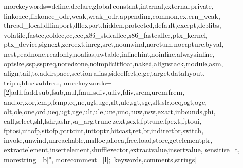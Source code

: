 \usepackage[english]{babel}
\usepackage[utf8]{inputenc}
\usepackage[T1]{fontenc}
\usepackage{helvet}
\usepackage{nimbusmononarrow}
\usepackage{euler}
\usepackage{tikz}
\usepackage{listings}
\usepackage{relsize}
\usepackage{booktabs}

\usetikzlibrary{arrows}
\usetikzlibrary{backgrounds}
\usetikzlibrary{chains}
\usetikzlibrary{fit}
\usetikzlibrary{positioning}
\usetikzlibrary{scopes}
\usetikzlibrary{trees}
\usetikzlibrary{automata}
\usetikzlibrary{positioning}
\usetikzlibrary{shapes.multipart}

{
	\begin{centering}
		\vspace{1.5em}
		\LARGE
    \insertframetitle
    \par
    \vspace{0.5em}
  \end{centering}
}

\lstset{basicstyle=\ttfamily\scriptsize}
\newcommand{\cinput}[1]{}
\newcommand{\cinline}[1]{\lstinline[language=C,basicstyle=\ttfamily]!#1!}
\newcommand{\cppinput}[1]{}
\newcommand{\cppinline}[1]{\lstinline[language=C++,basicstyle=\ttfamily]!#1!}
\newcommand{\llvminput}[1]{}
\newcommand{\llvminline}[1]{\lstinline[language=LLVM,basicstyle=\ttfamily]!#1!}
%
  {morekeywords={define,declare,global,constant,internal,external,private,%
      linkonce,linkonce_odr,weak,weak_odr,appending,common,extern_weak,%
      thread_local,dllimport,dllexport,hidden,protected,default,except,deplibs,%
      volatile,fastcc,coldcc,cc,ccc,x86_stdcallcc,x86_fastcallcc,ptx_kernel,%
      ptx_device,signext,zeroext,inreg,sret,nounwind,noreturn,nocapture,byval,%
      nest,readnone,readonly,noalias,uwtable,inlinehint,noinline,alwaysinline,%
      optsize,ssp,sspreq,noredzone,noimplicitfloat,naked,alignstack,module,asm,%
      align,tail,to,addrspace,section,alias,sideeffect,c,gc,target,datalayout,%
      triple,blockaddress},%
  morekeywords=[2]{add,fadd,sub,fsub,mul,fmul,sdiv,udiv,fdiv,srem,urem,frem,%
     and,or,xor,icmp,fcmp,eq,ne,ugt,uge,ult,ule,sgt,sge,slt,sle,oeq,ogt,oge,%
     olt,ole,one,ord,ueq,ugt,uge,ult,ule,une,uno,nuw,nsw,exact,inbounds,phi,%
     call,select,shl,lshr,ashr,va_arg,trunc,zext,sext,fptrunc,fpext,fptoui,%
     fptosi,uitofp,sitofp,ptrtoint,inttoptr,bitcast,ret,br,indirectbr,switch,%
     invoke,unwind,unreachable,malloc,alloca,free,load,store,getelementptr,%
     extractelement,insertelement,shufflevector,extractvalue,insertvalue},%
  sensitive=t,%
  morestring=[b]",%
  morecomment=[l];%
  }[keywords,comments,strings]
